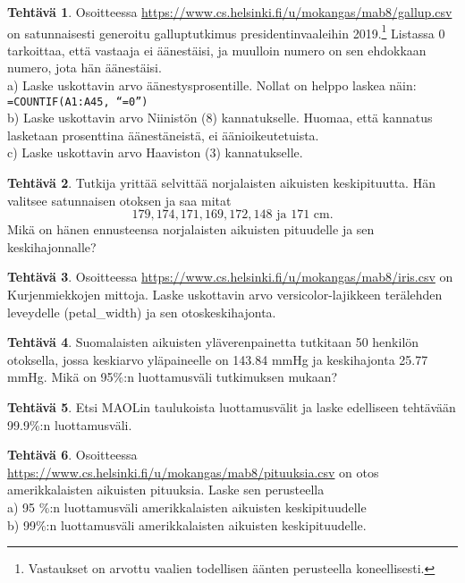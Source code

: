 \documentclass[12pt,leqno,a4paper,oneside]{amsart}
\theoremstyle{definition}
\newtheorem{exercise}{Tehtävä}
\theoremstyle{remark}
\numberwithin{equation}{section}
\begin{document}
\begin{exercise}
 Osoitteessa \url{https://www.cs.helsinki.fi/u/mokangas/mab8/gallup.csv} on satunnaisesti generoitu galluptutkimus presidentinvaaleihin 
 2019.\footnote{Vastaukset on arvottu vaalien todellisen äänten perusteella koneellisesti.} Listassa 0 tarkoittaa, että vastaaja ei äänestäisi,
 ja muulloin numero on sen ehdokkaan numero, jota hän äänestäisi.\\ 
 a) Laske uskottavin arvo äänestysprosentille. Nollat on helppo laskea näin: \texttt{=COUNTIF(A1:A45, ``=0'')}\\
 b) Laske uskottavin arvo Niinistön (8) kannatukselle. Huomaa, että kannatus lasketaan prosenttina äänestäneistä, ei äänioikeutetuista.\\
 c) Laske uskottavin arvo Haaviston (3) kannatukselle.
\end{exercise}




\begin{exercise}
 Tutkija yrittää selvittää norjalaisten aikuisten keski\-pituutta. Hän valitsee satunnaisen otoksen ja saa mitat
 $$179, 174, 171, 169, 172, 148 \text{ ja } 171 \text{ cm.} $$
 Mikä on hänen ennusteensa norjalaisten aikuisten pituudelle ja sen keskihajonnalle?
\end{exercise}

\begin{exercise}
 Osoitteessa \url{https://www.cs.helsinki.fi/u/mokangas/mab8/iris.csv} on Kurjenmiekkojen mittoja. Laske uskottavin arvo versicolor-lajikkeen terälehden
 leveydelle (petal\_width) ja sen otoskeskihajonta.
\end{exercise}




\begin{exercise}
 Suomalaisten aikuisten yläverenpainetta tutkitaan 50 henkilön otoksella, jossa keskiarvo yläpaineelle on 143.84 mmHg ja keskihajonta 25.77 mmHg.
 Mikä on 95\%:n luottamusväli tutkimuksen mukaan?
\end{exercise}


\begin{exercise}
 Etsi MAOLin taulukoista luottamusvälit ja laske edelliseen tehtävään 99.9\%:n luottamusväli.
\end{exercise}

\begin{exercise}
 Osoitteessa \url{https://www.cs.helsinki.fi/u/mokangas/mab8/pituuksia.csv} on otos amerikkalaisten aikuisten pituuksia. Laske sen perusteella\\
 a) 95 \%:n luottamusväli amerikkalaisten aikuisten keskipituudelle\\
 b) 99\%:n luottamusväli amerikkalaisten aikuisten keskipituudelle.
\end{exercise}
\end{document}

